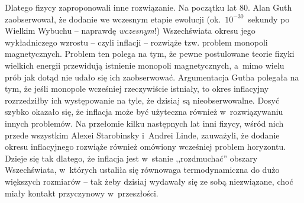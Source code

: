 \begin{dwieszpalty}
Dlatego fizycy zaproponowali inne rozwiązanie. Na początku lat 80. Alan Guth zaobserwował, że dodanie we wczesnym etapie ewolucji (ok.~$10^{-30}$~sekundy po Wielkim Wybuchu -- naprawdę \textit{wczesnym}!) Wszechświata okresu jego wykładniczego wzrostu -- czyli inflacji -- rozwiąże tzw. problem monopoli magnetycznych. Problem ten polega na tym, że pewne postulowane teorie fizyki wielkich energii przewidują istnienie monopoli magnetycznych, a~mimo wielu prób jak dotąd nie udało się ich zaobserwować. Argumentacja Gutha polegała na tym, że jeśli monopole wcześniej rzeczywiście istniały, to okres inflacyjny rozrzedziłby ich występowanie na tyle, że dzisiaj są nieobserwowalne. Dosyć szybko okazało się, że inflacja może być użyteczna również w~rozwiązywaniu innych problemów. Na przełomie kilku następnych lat inni fizycy, wśród nich przede wszystkim Alexei Starobinsky i~Andrei Linde, zauważyli, że dodanie okresu inflacyjnego rozwiąże również omówiony wcześniej problem horyzontu. Dzieje się tak dlatego, że inflacja jest w~stanie ,,rozdmuchać'' obszary Wszechświata, w~których ustaliła się równowaga termodynamiczna do dużo większych rozmiarów -- tak żeby dzisiaj wydawały się ze sobą niezwiązane, choć miały kontakt przyczynowy w~przeszłości.



\end{dwieszpalty}

